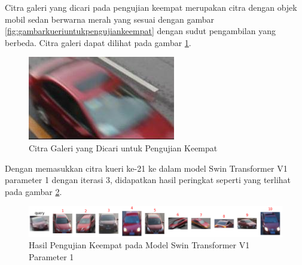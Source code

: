 Citra galeri yang dicari pada pengujian keempat merupakan citra dengan objek \linebreak mobil sedan berwarna merah 
yang sesuai dengan gambar \ref{fig:gambarkueriuntukpengujiankeempat} dengan sudut pengambilan yang berbeda. 
Citra galeri dapat dilihat pada gambar \ref{fig:gambargaleriuntukpengujiankeempat}.\\

\begin{figure}[h!]
  \centering
  \includegraphics[scale=0.4]{gambar/Gal21_1046.jpg}
  \caption{Citra Galeri yang Dicari untuk Pengujian Keempat}
  \label{fig:gambargaleriuntukpengujiankeempat}
\end{figure}

Dengan memasukkan citra kueri ke-21 ke dalam model Swin Transformer V1 parameter 1 dengan iterasi 3, didapatkan hasil 
peringkat seperti yang terlihat pada gambar \ref{fig:hasilpengujiankeempatpadamodelswintransformerv1param1}.

\begin{figure}[h!]
  \centering
  \includegraphics[scale=0.6]{gambar/Que21V1P1IT3.png}
  \caption{Hasil Pengujian Keempat pada Model Swin Transformer V1 Parameter 1}
  \label{fig:hasilpengujiankeempatpadamodelswintransformerv1param1}
\end{figure}


